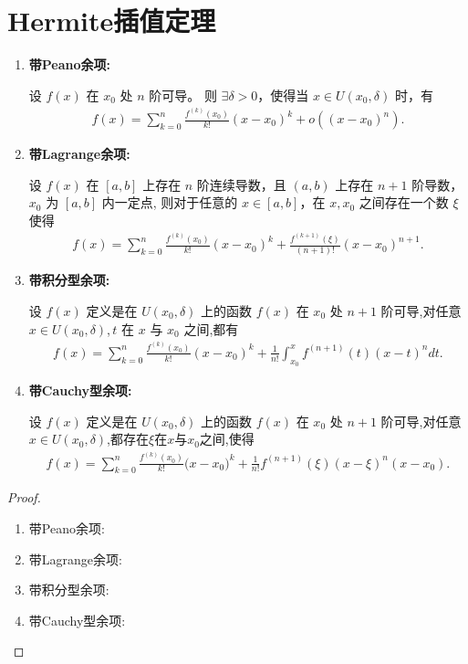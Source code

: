 \documentclass[../../main.tex]{subfiles}
\begin{document}
\section{Hermite插值定理}

\begin{theorem}[Taylor定理]\label{theorem:带各种余项的Taylor公式}
\begin{enumerate}[(1)]
\item \textbf{带Peano余项:}

设 $f(x)$ 在 $x_0$ 处 $n$ 阶可导。
则 $\exists \delta > 0$，使得当 $x \in U(x_0, \delta)$ 时，有
\begin{align*}
f(x) = \sum_{k=0}^{n} \frac{f^{(k)}(x_0)}{k!} (x - x_0)^k + o((x - x_0)^n).
\end{align*}

\item \textbf{带Lagrange余项:}

设 $f(x)$ 在 $[a, b]$ 上存在 $n$ 阶连续导数，且 $(a, b)$ 上存在 $n + 1$ 阶导数，$x_0$ 为 $[a, b]$ 内一定点,
则对于任意的 $x \in [a, b]$，在 $x, x_0$ 之间存在一个数 $\xi$ 使得
\begin{align*}
f(x) = \sum_{k=0}^{n} \frac{f^{(k)}(x_0)}{k!} (x - x_0)^k + \frac{f^{(k+1)}(\xi)}{(n + 1)!} (x - x_0)^{n+1}.
\end{align*}

\item \textbf{带积分型余项:}

设 $f(x)$ 定义是在 $U(x_0, \delta)$ 上的函数 $f(x)$ 在 $x_0$ 处 $n + 1$ 阶可导,对任意$x\in U(x_0, \delta)$,$\,t$ 在 $x$ 与 $x_0$ 之间,都有
\begin{align*}
f(x) = \sum_{k=0}^{n} \frac{f^{(k)}(x_0)}{k!} (x - x_0)^k + \frac{1}{n!} \int_{x_0}^{x} f^{(n+1)}(t) (x - t)^n dt.
\end{align*}

\item \textbf{带Cauchy型余项:}

设 $f(x)$ 定义是在 $U(x_0, \delta)$ 上的函数 $f(x)$ 在 $x_0$ 处 $n + 1$ 阶可导,对任意$x\in U(x_0, \delta)$,都存在$\xi$在$x$与$x_0$之间,使得
\begin{align*}
f(x)=\sum_{k=0}^n{\frac{f^{(k)}(x_0)}{k!}(x}-x_0)^k+\frac{1}{n!}f^{\left( n+1 \right)}\left( \xi \right) \left( x-\xi \right) ^n\left( x-x_0 \right) .
\end{align*}
\end{enumerate}
\end{theorem}
\begin{proof}
\begin{enumerate}[(1)]
\item {\heiti 带Peano余项:}



\item  {\heiti 带Lagrange余项:}



\item {\heiti 带积分型余项:}



\item {\heiti 带Cauchy型余项:}


\end{enumerate}
\end{proof}
\end{document}
